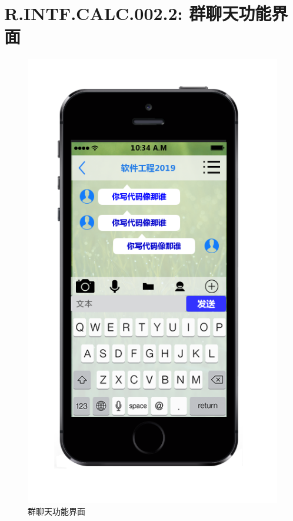     \section{R.INTF.CALC.002.2: 群聊天功能界面}
    \begin{figure}[h]
        \centering
        \includegraphics[scale=0.6]{OutlineDesign/figures/群聊天功能界面.png}
        \caption{群聊天功能界面}
        \label{fig:server_flow}
    \end{figure}
    \newpage
